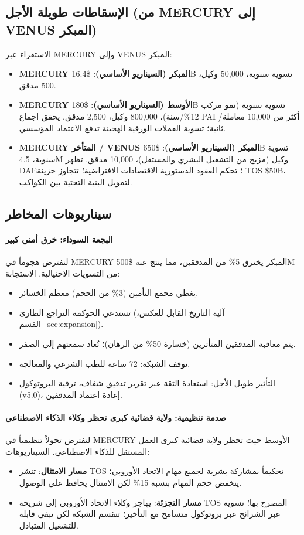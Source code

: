 \documentclass[11pt]{article}
\begin{document}
\subsection{الإسقاطات طويلة الأجل (من MERCURY إلى VENUS المبكر)}
الاستقراء عبر MERCURY وإلى VENUS المبكر:
\begin{itemize}[noitemsep]
  \item \textbf{MERCURY المبكر (السيناريو الأساسي)}: \$16.4B تسوية سنوية، 50,000 وكيل، 500 مدقق.
  \item \textbf{MERCURY الأوسط (السيناريو الأساسي)}: \$180B تسوية سنوية (نمو مركب 12\%/سنة)، 800,000 وكيل، 2,500 مدقق. يحقق إجماع PAI أكثر من 10,000 معاملة/ثانية؛ تسوية العملات الورقية الهجينة تدفع الاعتماد المؤسسي.
  \item \textbf{MERCURY المتأخر / VENUS المبكر (السيناريو الأساسي)}: \$650B تسوية سنوية، 4.5M وكيل (مزيج من التشغيل البشري والمستقل)، 10,000 مدقق. تظهر DAE؛ تحكم العقود الدستورية الاقتصادات الافتراضية؛ تتجاوز خزينة TOS \$50B، لتمويل البنية التحتية بين الكواكب.
\end{itemize}

\subsection{سيناريوهات المخاطر}
\paragraph{البجعة السوداء: خرق أمني كبير}
لنفترض هجوماً في MERCURY المبكر يخترق 5\% من المدققين، مما ينتج عنه \$500M من التسويات الاحتيالية. الاستجابة:
\begin{itemize}[noitemsep]
  \item يغطي مجمع التأمين (3\% من الحجم) معظم الخسائر.
  \item تستدعي الحوكمة التراجع الطارئ (آلية التاريخ القابل للعكس، القسم~\ref{sec:expansion}).
  \item يتم معاقبة المدققين المتأثرين (خسارة 50\% من الرهان)؛ تُعاد سمعتهم إلى الصفر.
  \item توقف الشبكة: 72 ساعة للطب الشرعي والمعالجة.
  \item التأثير طويل الأجل: استعادة الثقة عبر تقرير تدقيق شفاف، ترقية البروتوكول (v5.0)، إعادة اعتماد المدققين.
\end{itemize}

\paragraph{صدمة تنظيمية: ولاية قضائية كبرى تحظر وكلاء الذكاء الاصطناعي}
لنفترض تحولاً تنظيمياً في MERCURY الأوسط حيث تحظر ولاية قضائية كبرى العمل المستقل للذكاء الاصطناعي. السيناريوهات:
\begin{itemize}[noitemsep]
  \item \textbf{مسار الامتثال}: تنشر TOS تحكيماً بمشاركة بشرية لجميع مهام الاتحاد الأوروبي؛ ينخفض حجم المهام بنسبة 15\% لكن الامتثال يحافظ على الوصول.
  \item \textbf{مسار التجزئة}: يهاجر وكلاء الاتحاد الأوروبي إلى شريحة TOS المصرح بها؛ تسوية عبر الشرائح عبر بروتوكول متسامح مع التأخير؛ تنقسم الشبكة لكن تبقى قابلة للتشغيل المتبادل.
\end{itemize}
\end{document}
